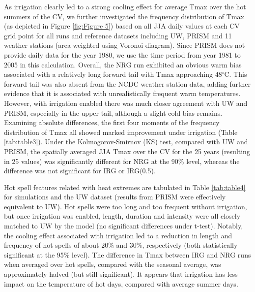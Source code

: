 \documentclass[draft,ms]{agutex}   %
\begin{document}
\begin{article}
As irrigation clearly led to a strong cooling effect for average Tmax over the hot summers of the CV, we further investigated the frequency distribution of Tmax (as depicted in Figure \ref{fig:Figure 5}) based on all JJA daily values at each CV grid point for all runs and reference datasets including UW, PRISM and 11 weather stations (area weighted using Voronoi diagram). Since PRISM does not provide daily data for the year 1980, we use the time period from year 1981 to 2005 in this calculation. Overall, the NRG run exhibited an obvious warm bias associated with a relatively long forward tail with Tmax approaching 48$^\circ$C.  This forward tail was also absent from the NCDC weather station data, adding further evidence that it is associated with unrealistically frequent warm temperatures. However, with irrigation enabled there was much closer agreement with UW and PRISM, especially in the upper tail, although a slight cold bias remains. Examining absolute differences, the first four moments of the frequency distribution of Tmax all showed marked improvement under irrigation (Table \ref{tab:table3}). Under the Kolmogorov-Smirnov (KS) test, compared with UW and PRISM, the spatially averaged JJA Tmax over the CV for the 25 years (resulting in 25 values) was significantly different for NRG at the 90\% level, whereas the difference was not significant for IRG or IRG(0.5).

Hot spell features related with heat extremes are tabulated in Table \ref{tab:table4} for simulations and the UW dataset (results from PRISM were effectively equivalent to UW). Hot spells were too long and too frequent without irrigation, but once irrigation was enabled, length, duration and intensity were all closely matched to UW by the model (no significant differences under t-test). Notably, the cooling effect associated with irrigation led to a reduction in length and frequency of hot spells of about 20$\%$ and 30$\%$, respectively (both statistically significant at the 95\% level). The difference in Tmax between IRG and NRG runs when averaged over hot spells, compared with the seasonal average, was approximately halved (but still significant). It appears that irrigation has less impact on the temperature of hot days, compared with average summer days.



\end{article}
\end{document}
